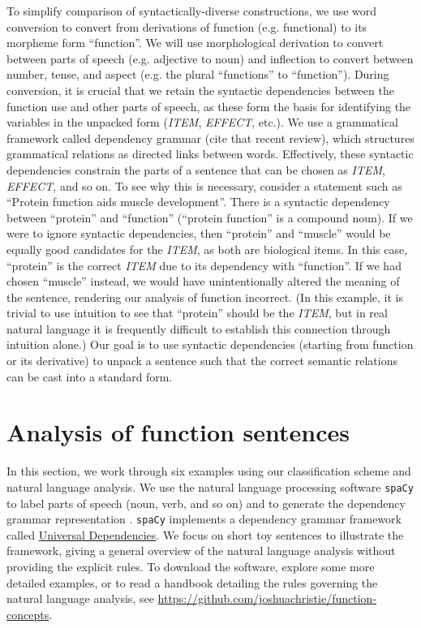 \documentclass{article}
\begin{document}
To simplify comparison of syntactically-diverse constructions, we use word conversion to convert from derivations of function (e.g. functional) to its morpheme form ``function''.
We will use morphological derivation to convert between parts of speech (e.g. adjective to noun) and inflection to convert between number, tense, and aspect (e.g. the plural ``functions'' to ``function'').
During conversion, it is crucial that we retain the syntactic dependencies between the function use and other parts of speech, as these form the basis for identifying the variables in the unpacked form (\emph{ITEM}, \emph{EFFECT}, etc.).
We use a grammatical framework called dependency grammar (cite that recent review), which structures grammatical relations as directed links between words.
Effectively, these syntactic dependencies constrain the parts of a sentence that can be chosen as \emph{ITEM}, \emph{EFFECT}, and so on.
To see why this is necessary, consider a statement such as ``Protein function aids muscle development''.
There is a syntactic dependency between ``protein'' and ``function'' (``protein function'' is a compound noun).
If we were to ignore syntactic dependencies, then ``protein'' and ``muscle'' would be equally good candidates for the \emph{ITEM}, as both are biological items.
In this case, ``protein'' is the correct \emph{ITEM} due to its dependency with ``function''.
If we had chosen ``muscle'' instead, we would have unintentionally altered the meaning of the sentence, rendering our analysis of function incorrect.
(In this example, it is trivial to use intuition to see that ``protein'' should be the \emph{ITEM}, but in real natural language it is frequently difficult to establish this connection through intuition alone.)
Our goal is to use syntactic dependencies (starting from function or its derivative) to unpack a sentence such that the correct semantic relations can be cast into a standard form.

\section{Analysis of function sentences}
\label{sec:example-sentences}

In this section, we work through six examples using our classification scheme and natural language analysis.
We use the natural language processing software \texttt{spaCy} to label parts of speech (noun, verb, and so on) and to generate the dependency grammar representation \cite{spacy}.
\texttt{spaCy} implements a dependency grammar framework called \href{https://universaldependencies.org/#language-en}{Universal Dependencies}.
We focus on short toy sentences to illustrate the framework, giving a general overview of the natural language analysis without providing the explicit rules.
To download the software, explore some more detailed examples, or to read a handbook detailing the rules governing the natural language analysis, see
\newline
\href{https://github.com/joshuachristie/function-concepts}{https://github.com/joshuachristie/function-concepts}.
\end{document}
